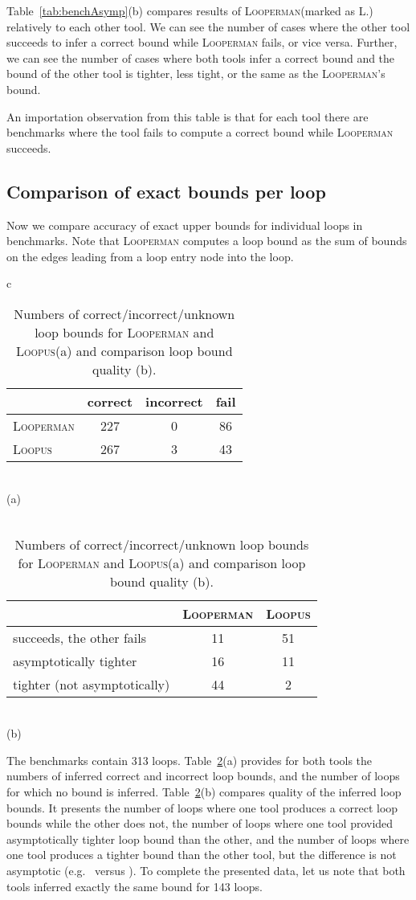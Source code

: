 \documentclass[10pt,a4paper]{article}
\newcommand{\Looperman}{\textsc{Looperman}\xspace}
\newcommand{\Loopus}{\textsc{Loopus}\xspace}
\begin{document}
Table~\ref{tab:benchAsymp}(b) compares results of \Looperman (marked as
\textsc{L.}) relatively to each other tool. We can see the number of cases
where the other tool succeeds to infer a correct bound while \Looperman
fails, or vice versa.  Further, we can see the number of cases where both
tools infer a correct bound and the bound of the other tool is tighter, less
tight, or the same as the \Looperman's bound.

An importation observation from this table is that for each tool there
are benchmarks where the tool fails to compute a correct bound while
\Looperman succeeds. 


\subsection{Comparison of exact bounds per loop}\label{sec:evalExact}

Now we compare accuracy of exact upper bounds for individual loops in
benchmarks. Note that \Looperman computes a loop bound as the sum of
bounds on the edges leading from a loop entry node into the loop.

\begin{table}[t]
\begin{center}
\begin{tabular}{c}
\begin{tabular}{l|ccc}
& correct & incorrect & fail \\
\hline
\Looperman & 227 & 0 & 86 \\
\Loopus & 267 & 3 & 43\\
\end{tabular}
\\
(a)
\\\\
\begin{tabular}{l|cc}
& \Looperman & \Loopus \\ \hline
succeeds, the other fails & 11 & 51 \\ 
asymptotically tighter & 16 & 11 \\
tighter (not asymptotically) & 44 & 2
\end{tabular}
\\
(b)
\end{tabular}
\end{center}
\caption{Numbers of correct/incorrect/unknown loop bounds for \Looperman and
  \Loopus (a) and comparison loop bound quality (b).}
\label{tab:benchLoops}
\end{table}

The benchmarks contain 313 loops. Table~\ref{tab:benchLoops}(a) provides for
both tools the numbers of inferred correct and incorrect loop bounds, and the
number of loops for which no bound is inferred.
Table~\ref{tab:benchLoops}(b) compares quality of the inferred loop
bounds.  It presents the number of loops where one tool produces a
correct loop bounds while the other does not, the number of loops
where one tool provided asymptotically tighter loop bound than the
other, and the number of loops where one tool produces a tighter bound
than the other tool, but the difference is not asymptotic (e.g.~
versus ). To complete the presented data, let us note that both
tools inferred exactly the same bound for 143 loops.
\end{document}
